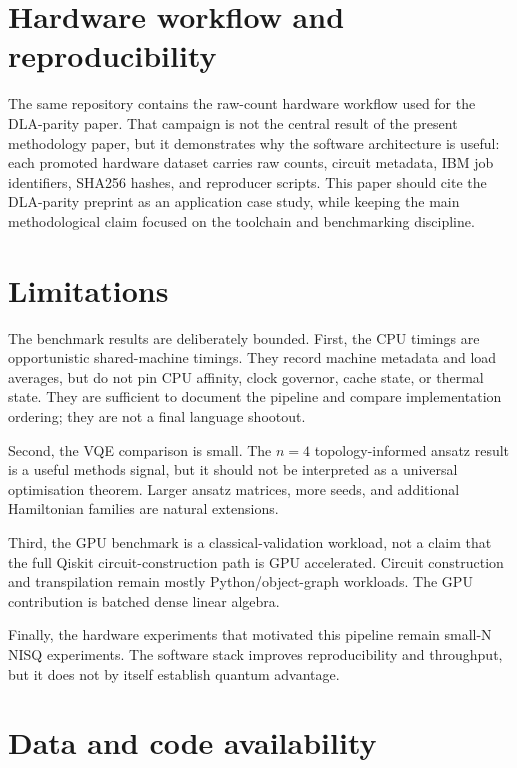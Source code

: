 \documentclass[preprint,aps,physrev,superscriptaddress,floatfix,longbibliography]{revtex4-2}
\begin{document}
\section{Hardware workflow and reproducibility}

The same repository contains the raw-count hardware workflow used for the
DLA-parity paper. That campaign is not the central result of the present
methodology paper, but it demonstrates why the software architecture is
useful: each promoted hardware dataset carries raw counts, circuit
metadata, IBM job identifiers, SHA256 hashes, and reproducer scripts. This
paper should cite the DLA-parity preprint as an application case study,
while keeping the main methodological claim focused on the toolchain and
benchmarking discipline.

\section{Limitations}

The benchmark results are deliberately bounded. First, the CPU timings
are opportunistic shared-machine timings. They record machine metadata
and load averages, but do not pin CPU affinity, clock governor, cache
state, or thermal state. They are sufficient to document the pipeline and
compare implementation ordering; they are not a final language shootout.

Second, the VQE comparison is small. The $n=4$ topology-informed ansatz
result is a useful methods signal, but it should not be interpreted as a
universal optimisation theorem. Larger ansatz matrices, more seeds, and
additional Hamiltonian families are natural extensions.

Third, the GPU benchmark is a classical-validation workload, not a claim
that the full Qiskit circuit-construction path is GPU accelerated. Circuit
construction and transpilation remain mostly Python/object-graph
workloads. The GPU contribution is batched dense linear algebra.

Finally, the hardware experiments that motivated this pipeline remain
small-N NISQ experiments. The software stack improves reproducibility and
throughput, but it does not by itself establish quantum advantage.

\section{Data and code availability}
\end{document}
